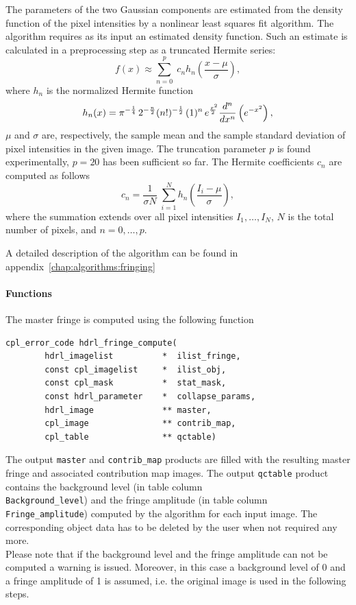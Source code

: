 The parameters of the two Gaussian components are estimated from the
density function of the pixel intensities by a nonlinear least squares
fit algorithm.  The algorithm requires as its input an estimated
density function.  Such an estimate is calculated in a preprocessing
step as a truncated Hermite series:
\begin{equation}
  f(x) \approx \sum_{n=0}^p \; c_n h_n\left(\frac{x - \mu}{\sigma}\right),
\end{equation}
where $h_n$ is the normalized Hermite function
\begin{equation}
  h_n(x) = {\pi}^{-\frac14} \,
  2^{-\frac{n}{2}} (n!)^{-\frac12} \, (\-1)^n \, e^{\frac{x^2\!\!}{2}} \,
  \frac{d^n}{dx^n}\left( e^{-x^2} \right),
\end{equation}
$\mu$ and $\sigma$ are, respectively, the sample mean and the sample
standard deviation of pixel intensities in the given image.  The
truncation parameter $p$ is found experimentally, $p = 20$ has been
sufficient so far.  The Hermite coefficients $c_n$ are computed as
follows
\begin{equation}
  c_n = \frac1{\sigma N}\; \sum_{i=1}^N h_n\left(\frac{I_i - \mu}{\sigma}\right),
\end{equation}
where the summation extends over all pixel intensities
$I_1, \ldots, I_{N}$, $N$ is the total number of pixels, and
$n = 0, \ldots, p$.

A detailed description of the algorithm can be found in
appendix~\ref{chap:algorithms:fringing}


\paragraph{Functions}
\label{fringe:algorithms:compute:functions}

The master fringe is computed using the following function

\begin{lstlisting}
cpl_error_code hdrl_fringe_compute(
        hdrl_imagelist          *  ilist_fringe, 
        const cpl_imagelist     *  ilist_obj,
        const cpl_mask          *  stat_mask, 
        const hdrl_parameter    *  collapse_params,
        hdrl_image              ** master, 
        cpl_image               ** contrib_map,
        cpl_table               ** qctable)
\end{lstlisting}

The output \verb+master+ and \verb+contrib_map+ products are filled
with the resulting master fringe and associated contribution map
images. The output \verb+qctable+ product contains the background
level (in table column \\ \verb+Background_level+) and the fringe
amplitude (in table column \verb+Fringe_amplitude+) computed by the
algorithm for each input image. The corresponding object data has to
be deleted by the user when not required any more.\\
Please note that if the background level and the fringe amplitude can
not be computed a warning is issued. Moreover, in this case a
background level of 0 and a fringe amplitude of 1 is assumed, i.e. the
original image is used in the following steps.

